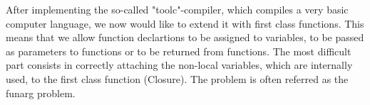 After implementing the so-called "toolc"-compiler, which compiles a very basic computer language, we now would like to extend it with first class functions. This means that we allow function declartions to be assigned to variables, to be passed as parameters to functions or to be returned from functions.
The most difficult part consists in correctly attaching the non-local variables, which are internally used, to the first class function (Closure). The problem is often referred as the funarg problem.